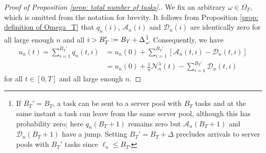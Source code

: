 \documentclass[a4paper, 12pt]{article}
\theoremstyle{definition}
\newcommand{\defeq}{\vcentcolon=}
\newcommand{\calA}{\mathcal{A}}
\newcommand{\calD}{\mathcal{D}}
\newcommand{\calN}{\mathcal{N}}
\begin{document}
\begin{appendices}
	\begin{proof}[Proof of Proposition \ref{prop: total number of tasks}.]
	We fix an arbitrary $\omega \in \Omega_T$, which is omitted from the notation for brevity. It follows from Proposition \ref{prop: definition of Omega_T} that $q_n(i)$, $\calA_n(i)$ and $\calD_n(i)$ are identically zero for all large enough $n$ and all $i > B_T' \defeq B_T + \Delta$\footnote{If $B_T' = B_T$, a task can be sent to a server pool with $B_T$ tasks and at the same instant a task can leave from the same server pool, although this has probability zero; here $q_n(B_T + 1)$ remains zero but $\calA_n(B_T + 1)$ and $\calD_n(B_T + 1)$ have a jump. Setting $B_T' = B_T + \Delta$ precludes arrivals to server pools with $B_T'$ tasks since $\ell_n \leq B_T$.}. Consequently, we have
	\begin{align*}
		u_n(t) = \sum_{i = 1}^{B_T'} q_n(t, i) &= u_n(0) + \sum_{i = 1}^{B_T'} \left[\calA_n(t, i) - \calD_n(t, i)\right] \\
		&= u_n(0) + \frac{1}{n}\calN_n^\lambda(t) - \sum_{i = 1}^{B_T'} \calD_n(t, i)
	\end{align*}
	for all $t \in [0, T]$ and all large enough $n$.
	

\end{proof}
\end{appendices}
\end{document}
